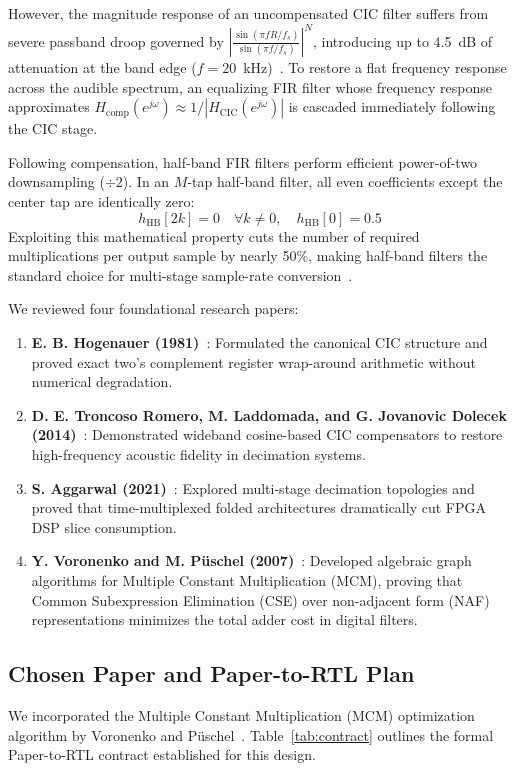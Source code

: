 \documentclass[11pt,a4paper]{article}
\begin{document}
However, the magnitude response of an uncompensated CIC filter suffers from severe passband droop governed by $\left|\frac{\sin(\pi f R / f_s)}{\sin(\pi f / f_s)}\right|^N$, introducing up to 4.5~dB of attenuation at the band edge ($f = 20$~kHz)~\cite{dolecek2009}. To restore a flat frequency response across the audible spectrum, an equalizing FIR filter whose frequency response approximates $H_{\text{comp}}(e^{j\omega}) \approx 1 / |H_{\text{CIC}}(e^{j\omega})|$ is cascaded immediately following the CIC stage.

Following compensation, half-band FIR filters perform efficient power-of-two downsampling ($\div 2$). In an $M$-tap half-band filter, all even coefficients except the center tap are identically zero:
\begin{equation}
  h_{\text{HB}}[2k] = 0 \quad \forall k \ne 0, \quad h_{\text{HB}}[0] = 0.5
  \label{eq:halfband}
\end{equation}
Exploiting this mathematical property cuts the number of required multiplications per output sample by nearly 50\%, making half-band filters the standard choice for multi-stage sample-rate conversion~\cite{aggarwal2021}.

We reviewed four foundational research papers:
\begin{enumerate}
  \item \textbf{E. B. Hogenauer (1981)}~\cite{hogenauer1981}: Formulated the canonical CIC structure and proved exact two's complement register wrap-around arithmetic without numerical degradation.
  \item \textbf{D. E. Troncoso Romero, M. Laddomada, and G. Jovanovic Dolecek (2014)}~\cite{troncoso2014}: Demonstrated wideband cosine-based CIC compensators to restore high-frequency acoustic fidelity in decimation systems.
  \item \textbf{S. Aggarwal (2021)}~\cite{aggarwal2021}: Explored multi-stage decimation topologies and proved that time-multiplexed folded architectures dramatically cut FPGA DSP slice consumption.
  \item \textbf{Y. Voronenko and M. P\"uschel (2007)}~\cite{voronenko2007}: Developed algebraic graph algorithms for Multiple Constant Multiplication (MCM), proving that Common Subexpression Elimination (CSE) over non-adjacent form (NAF) representations minimizes the total adder cost in digital filters.
\end{enumerate}

\subsection{Chosen Paper and Paper-to-RTL Plan}
We incorporated the Multiple Constant Multiplication (MCM) optimization algorithm by Voronenko and P\"uschel~\cite{voronenko2007}. Table~\ref{tab:contract} outlines the formal Paper-to-RTL contract established for this design.
\end{document}
